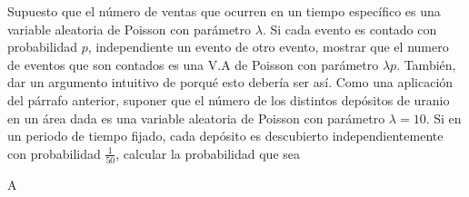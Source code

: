 	\question%
		Supuesto que el número de ventas que ocurren en un tiempo específico es una variable aleatoria de Poisson con parámetro $\lambda$. Si cada evento es contado con probabilidad $p$, independiente un evento de otro evento, mostrar que el numero de eventos que son contados es una V.A de Poisson con parámetro $\lambda p$. También, dar un argumento intuitivo de porqué esto debería ser así. Como una aplicación del párrafo anterior, suponer que el número de los distintos depósitos de uranio en un área dada es una variable aleatoria de Poisson con parámetro $\lambda=10$. Si en un periodo de tiempo fijado, cada depósito es descubierto independientemente con probabilidad $\tfrac{1}{50}$, calcular la probabilidad que sea
		
	
	\begin{solutionorgrid}
		A
	\end{solutionorgrid}